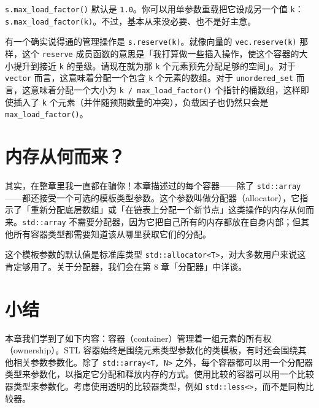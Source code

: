 \texttt{s.\allowbreak{}max\_\allowbreak{}load\_\allowbreak{}factor(\allowbreak{})\allowbreak{}} 默认是 \texttt{1.0}。你可以用单参数重载把它设成另一个值 \texttt{k}：\texttt{s.\allowbreak{}max\_\allowbreak{}load\_\allowbreak{}factor(\allowbreak{}k)\allowbreak{}}。不过，基本从来没必要、也不是好主意。

有一个确实说得通的管理操作是 \texttt{s.\allowbreak{}reserve(\allowbreak{}k)\allowbreak{}}。就像向量的 \texttt{vec.\allowbreak{}reserve(\allowbreak{}k)\allowbreak{}} 那样，这个 \texttt{reserve} 成员函数的意思是「我打算做一些插入操作，使这个容器的大小提升到接近 \texttt{k} 的量级。请现在就为那 \texttt{k} 个元素预先分配足够的空间」。对于 \texttt{vector} 而言，这意味着分配一个包含 \texttt{k} 个元素的数组。对于 \texttt{unordered\_\allowbreak{}set} 而言，这意味着分配一个大小为 \texttt{k /\allowbreak{} max\_\allowbreak{}load\_\allowbreak{}factor(\allowbreak{})\allowbreak{}} 个指针的桶数组，这样即使插入了 \texttt{k} 个元素（并伴随预期数量的冲突），负载因子也仍然只会是 \texttt{max\_\allowbreak{}load\_\allowbreak{}factor(\allowbreak{})\allowbreak{}}。

\section{内存从何而来？}

其实，在整章里我一直都在骗你！本章描述过的每个容器——除了 \texttt{std::\allowbreak{}array}——都还接受一个可选的模板类型参数。这个参数叫做分配器（allocator），它指示了「重新分配底层数组」或「在链表上分配一个新节点」这类操作的内存从何而来。\texttt{std::\allowbreak{}array} 不需要分配器，因为它把自己所有的内存都放在自身内部；但其他所有容器类型都需要知道该从哪里获取它们的分配。

这个模板参数的默认值是标准库类型 \texttt{std::\allowbreak{}allocator<\allowbreak{}T>\allowbreak{}}，对大多数用户来说这肯定够用了。关于分配器，我们会在第 8 章「分配器」中详谈。

\section{小结}

本章我们学到了如下内容：容器（container）管理着一组元素的所有权（ownership）。STL 容器始终是围绕元素类型参数化的类模板，有时还会围绕其他相关参数参数化。除了 \texttt{std::\allowbreak{}array<\allowbreak{}T,\allowbreak{} N>\allowbreak{}} 之外，每个容器都可以用一个分配器类型来参数化，以指定它分配和释放内存的方式。使用比较的容器可以用一个比较器类型来参数化。考虑使用透明的比较器类型，例如 \texttt{std::\allowbreak{}less<>}，而不是同构比较器。

